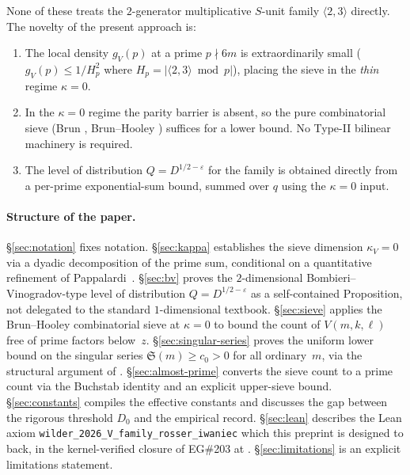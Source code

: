 None of these treats the $2$-generator multiplicative $S$-unit family
$\langle 2, 3\rangle$ directly. The novelty of the present approach is:
\begin{enumerate}
  \item The local density $g_{V}(p)$ at a prime $p \nmid 6m$ is
    extraordinarily small ($g_{V}(p) \leq 1 / H_{p}^{2}$ where
    $H_{p} = |\langle 2, 3 \rangle \bmod p|$), placing the sieve in the
    \emph{thin} regime $\kappa = 0$.
  \item In the $\kappa = 0$ regime the parity barrier is absent, so the
    pure combinatorial sieve (Brun \cite{Brun1915}, Brun--Hooley
    \cite{Hooley1972}) suffices for a lower bound. No Type-II bilinear
    machinery is required.
  \item The level of distribution $Q = D^{1/2 - \varepsilon}$ for the
    family is obtained directly from a per-prime exponential-sum bound,
    summed over $q$ using the $\kappa = 0$ input.
\end{enumerate}

\paragraph{Structure of the paper.}
\S\ref{sec:notation} fixes notation. \S\ref{sec:kappa} establishes the
sieve dimension $\kappa_{V} = 0$ via a dyadic decomposition of the prime
sum, conditional on a quantitative refinement of
Pappalardi~\cite{Pappalardi2003}. \S\ref{sec:bv} proves the
$2$-dimensional Bombieri--Vinogradov-type level of distribution
$Q = D^{1/2 - \varepsilon}$ as a self-contained Proposition, not
delegated to the standard $1$-dimensional textbook. \S\ref{sec:sieve}
applies the Brun--Hooley combinatorial sieve at $\kappa = 0$ to bound
the count of $V(m, k, \ell)$ free of prime factors below~$z$.
\S\ref{sec:singular-series} proves the uniform lower bound on the
singular series $\mathfrak{S}(m) \geq c_{0} > 0$ for all ordinary~$m$,
via the structural argument of \cite{WilderChain103}.
\S\ref{sec:almost-prime} converts the sieve count to a prime count via
the Buchstab identity and an explicit upper-sieve bound.
\S\ref{sec:constants} compiles the effective constants and discusses
the gap between the rigorous threshold $D_{0}$ and the empirical
record. \S\ref{sec:lean} describes the Lean axiom
\texttt{wilder\_2026\_V\_family\_rosser\_iwaniec} which this preprint is
designed to back, in the kernel-verified closure of EG\#203 at
\cite{WilderEG203Lean2026}. \S\ref{sec:limitations} is an explicit
limitations statement.

